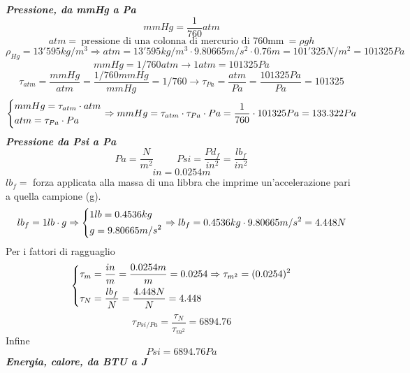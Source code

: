 \documentclass[a4paper, 15pt]{article}
\begin{document}
	\textit{\textbf{Pressione, da mmHg a Pa}}  
	\[ mmHg = \dfrac{1}{760} atm\]
	\[ atm = ~ \text{pressione di una colonna di mercurio di 760mm} ~ = \rho g h\]
	\[\rho_{Hg} = 13'595 kg/m^3 \Rightarrow atm = 13'595 kg/m^3 \cdot 9.80665 m/s^2 \cdot 0.76m = 101'325N/m^2 = 101325Pa \]
	\[ mmHg = 1/760 atm \rightarrow 1atm = 101325Pa\]
	\[ \tau_{atm} = \dfrac{mmHg}{atm} = \dfrac{1/760 mmHg}{mmHg} = 1/760 \rightarrow \tau_{Pa} = \dfrac{atm}{Pa} = \dfrac{101325 Pa}{Pa} = 101325\]
	\[ \begin{dcases}
		mmHg = \tau_{atm} \cdot atm \\
		atm = \tau_{Pa} \cdot Pa
	\end{dcases} \Rightarrow mmHg = \tau_{atm} \cdot \tau_{Pa} \cdot Pa = \dfrac{1}{760} \cdot 101325 Pa = 133.322Pa\]
\newpage
	\textit{\textbf{Pressione da Psi a Pa}} 
	\[ Pa = \dfrac{N}{m^2} \hspace{1cm} Psi = \dfrac{Pd_f}{in^2} = \dfrac{lb_f}{in^2}\]
	\[ in = 0.0254m\]
	$lb_f =$ forza applicata alla massa di una libbra che imprime un'accelerazione pari a quella campione (g).
	\[lb_f = 1lb \cdot g \Rightarrow \begin{dcases}
		1lb = 0.4536kg \\
		g = 9.80665m/s^2
	\end{dcases} \Rightarrow lb_f = 0.4536kg \cdot 9.80665m/s^2 = 4.448N  \]
	Per i fattori di ragguaglio
	\[ \begin{dcases}
		\begin{aligned}
	\tau_m & = \dfrac{in}{m} = \dfrac{0.0254m}{m} = 0.0254 \Rightarrow\tau_{m^2} = (0.0254)^2 \\
	\tau_N & = \dfrac{lb_f}{N} = \dfrac{4.448N}{N} = 4.448 
		\end{aligned}	
	\end{dcases}\]
 	\[ \tau_{Psi/Pa} = \dfrac{\tau_N}{\tau_{m^2}} = 6894.76 \]
 	Infine 
 	\[ Psi = 6894.76 Pa \] 	
 	\textit{\textbf{Energia, calore, da BTU a J}} 
 	
\end{document}
